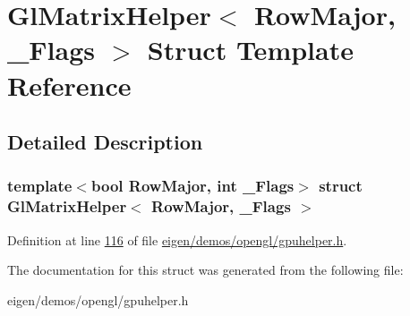 \hypertarget{struct_gl_matrix_helper}{}\section{Gl\+Matrix\+Helper$<$ Row\+Major, \+\_\+\+Flags $>$ Struct Template Reference}
\label{struct_gl_matrix_helper}


\subsection{Detailed Description}
\subsubsection*{template$<$bool Row\+Major, int \+\_\+\+Flags$>$\newline
struct Gl\+Matrix\+Helper$<$ Row\+Major, \+\_\+\+Flags $>$}



Definition at line \hyperlink{eigen_2demos_2opengl_2gpuhelper_8h_source_l00116}{116} of file \hyperlink{eigen_2demos_2opengl_2gpuhelper_8h_source}{eigen/demos/opengl/gpuhelper.\+h}.



The documentation for this struct was generated from the following file\+:\begin{DoxyCompactItemize}
\item 
eigen/demos/opengl/gpuhelper.\+h\end{DoxyCompactItemize}
